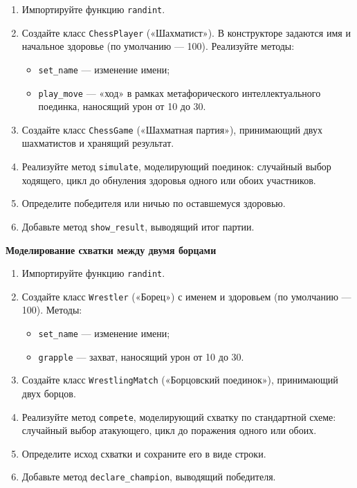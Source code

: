 \begin{enumerate}
    \item Импортируйте функцию \texttt{randint}.

    \item Создайте класс \texttt{ChessPlayer} («Шахматист»).  
    В конструкторе задаются имя и начальное здоровье (по умолчанию — 100).  
    Реализуйте методы:
    \begin{itemize}
        \item \texttt{set\_name} — изменение имени;
        \item \texttt{play\_move} — «ход» в рамках метафорического интеллектуального поединка, наносящий урон от 10 до 30.
    \end{itemize}

    \item Создайте класс \texttt{ChessGame} («Шахматная партия»), принимающий двух шахматистов и хранящий результат.

    \item Реализуйте метод \texttt{simulate}, моделирующий поединок: случайный выбор ходящего, цикл до обнуления здоровья одного или обоих участников.

    \item Определите победителя или ничью по оставшемуся здоровью.

    \item Добавьте метод \texttt{show\_result}, выводящий итог партии.
\end{enumerate}

\item \textbf{Моделирование схватки между двумя борцами}

\begin{enumerate}
    \item Импортируйте функцию \texttt{randint}.

    \item Создайте класс \texttt{Wrestler} («Борец») с именем и здоровьем (по умолчанию — 100).  
    Методы:
    \begin{itemize}
        \item \texttt{set\_name} — изменение имени;
        \item \texttt{grapple} — захват, наносящий урон от 10 до 30.
    \end{itemize}

    \item Создайте класс \texttt{WrestlingMatch} («Борцовский поединок»), принимающий двух борцов.

    \item Реализуйте метод \texttt{compete}, моделирующий схватку по стандартной схеме: случайный выбор атакующего, цикл до поражения одного или обоих.

    \item Определите исход схватки и сохраните его в виде строки.

    \item Добавьте метод \texttt{declare\_champion}, выводящий победителя.
\end{enumerate}

